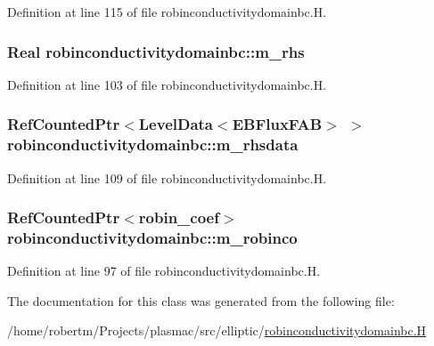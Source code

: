 Definition at line 115 of file robinconductivitydomainbc.\+H.

\subsubsection[{\texorpdfstring{m\+\_\+rhs}{m_rhs}}]{\setlength{\rightskip}{0pt plus 5cm}Real robinconductivitydomainbc\+::m\+\_\+rhs\hspace{0.3cm}{\ttfamily [protected]}}\hypertarget{classrobinconductivitydomainbc_a28643b76a21e669ce19c2c4bd0a4a1e1}{}\label{classrobinconductivitydomainbc_a28643b76a21e669ce19c2c4bd0a4a1e1}


Definition at line 103 of file robinconductivitydomainbc.\+H.

\subsubsection[{\texorpdfstring{m\+\_\+rhsdata}{m_rhsdata}}]{\setlength{\rightskip}{0pt plus 5cm}Ref\+Counted\+Ptr$<$Level\+Data$<$E\+B\+Flux\+F\+AB$>$ $>$ robinconductivitydomainbc\+::m\+\_\+rhsdata\hspace{0.3cm}{\ttfamily [protected]}}\hypertarget{classrobinconductivitydomainbc_a103895237c51dd63c057f0c4ef3de846}{}\label{classrobinconductivitydomainbc_a103895237c51dd63c057f0c4ef3de846}


Definition at line 109 of file robinconductivitydomainbc.\+H.

\subsubsection[{\texorpdfstring{m\+\_\+robinco}{m_robinco}}]{\setlength{\rightskip}{0pt plus 5cm}Ref\+Counted\+Ptr$<${\bf robin\+\_\+coef}$>$ robinconductivitydomainbc\+::m\+\_\+robinco\hspace{0.3cm}{\ttfamily [protected]}}\hypertarget{classrobinconductivitydomainbc_af035d7b5d25bbb12f006c7a21ff605e8}{}\label{classrobinconductivitydomainbc_af035d7b5d25bbb12f006c7a21ff605e8}


Definition at line 97 of file robinconductivitydomainbc.\+H.



The documentation for this class was generated from the following file\+:\begin{DoxyCompactItemize}
\item 
/home/robertm/\+Projects/plasmac/src/elliptic/\hyperlink{robinconductivitydomainbc_8H}{robinconductivitydomainbc.\+H}\end{DoxyCompactItemize}
